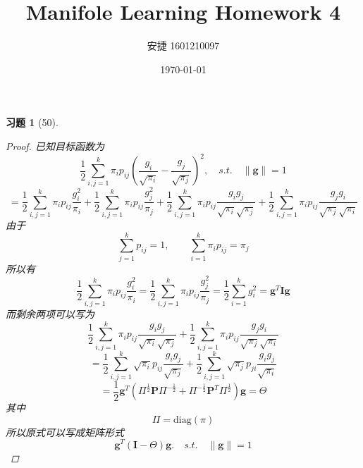 \documentclass[a4paper, UTF8]{ctexart}
\title{Manifole Learning Homework 4}
\date{\today}
\author{安捷 1601210097}
\newtheorem*{exercise}{\textbf{习题}}
\begin{document}
\maketitle
  \begin{exercise}[50]
    \begin{proof}
      已知目标函数为
      \begin{equation}
        \frac{1}{2} \sum_{i,j=1}^k \pi_i p_{ij}\left( \frac{g_i}{\sqrt{\pi_i}} - \frac{g_j}{\sqrt{\pi_j}}\right)^2,\quad s.t.\quad \lVert \mathbf{g} \rVert = 1
      \end{equation}
      \begin{equation}
        = \frac{1}{2}\sum_{i,j=1}^k \pi_i p_{ij} \frac{g_i^2}{\pi_i} + \frac{1}{2}\sum_{i,j=1}^k\pi_i p_{ij} \frac{g_j^2}{\pi_j} + \frac{1}{2} \sum_{i,j=1}^k \pi_i p_{ij}\frac{g_i g_j}{\sqrt{\pi_i} \sqrt{\pi_j}} + \frac{1}{2} \sum_{i,j=1}^k \pi_i p_{ij}\frac{g_j g_i}{\sqrt{\pi_j} \sqrt{\pi_i}}
      \end{equation}
      由于
      \begin{equation}
        \sum_{j=1}^kp_{ij} = 1, \qquad \sum_{i = 1}^k \pi_i p_{ij} = \pi_j
      \end{equation}
      所以有
      \begin{equation}
        \frac{1}{2}\sum_{i,j=1}^k \pi_i p_{ij}\frac{g_i^2}{\pi_i} = \frac{1}{2}\sum_{i,j=1}^k \pi_i p_{ij}\frac{g_j^2}{\pi_j} = \frac{1}{2}\sum_{i=1}^k g_i^2 = \mathbf{g}^T \mathbf{I} \mathbf{g}
      \end{equation}
      而剩余两项可以写为
      \begin{equation}
        \frac{1}{2} \sum_{i,j=1}^k \pi_i p_{ij}\frac{g_i g_j}{\sqrt{\pi_i} \sqrt{\pi_j}} + \frac{1}{2} \sum_{i,j=1}^k \pi_i p_{ij}\frac{g_j g_i}{\sqrt{\pi_j} \sqrt{\pi_i}}
      \end{equation}
      \begin{equation}
        = \frac{1}{2} \sum_{i,j=1}^k \sqrt{\pi_i} p_{ij}\frac{g_i g_j}{\sqrt{\pi_j}}+ \frac{1}{2} \sum_{i,j=1}^k \sqrt{\pi_j} p_{ji}\frac{g_i g_j}{\sqrt{\pi_i}}
      \end{equation}
      \begin{equation}
        = \frac{1}{2}\mathbf{g}^T\left( \Pi^{\frac{1}{2}}\mathbf{P}\Pi^{-\frac{1}{2}} + \Pi^{-\frac{1}{2}} \mathbf{P}^T \Pi^{\frac{1}{2}} \right)\mathbf{g} = \Theta
      \end{equation}
      其中
      \begin{equation}
        \Pi = \mathrm{diag}\left( \pi \right)
      \end{equation}
      所以原式可以写成矩阵形式
      \begin{equation}
        \mathbf{g}^T \left( \mathbf{I} - \Theta \right) \mathbf{g}. \quad s.t. \quad \lVert \mathbf{g}\rVert = 1
      \end{equation}
    \end{proof}
  \end{exercise}
\end{document}
